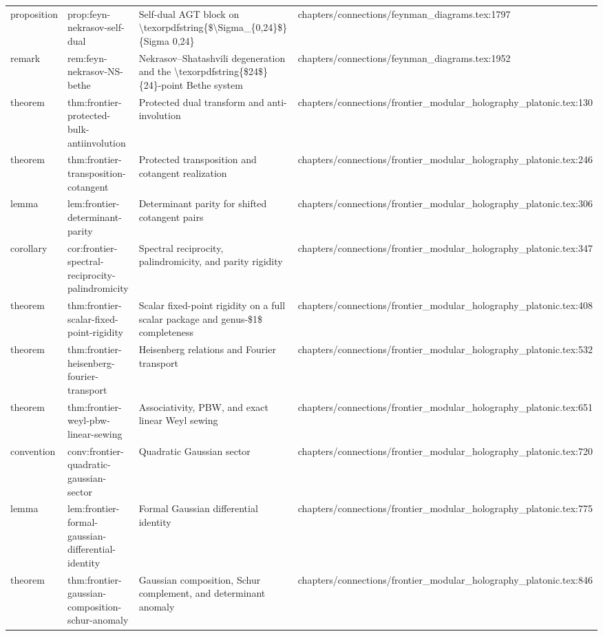 \documentclass[11pt]{article}
\begin{document}
\begin{longtable}{L{0.10\textwidth}L{0.26\textwidth}L{0.42\textwidth}L{0.22\textwidth}}
proposition & prop:feyn-nekrasov-self-dual & Self-dual AGT block on \textbackslash{}texorpdfstring\{\$\textbackslash{}Sigma\_\{0,24\}\$\}\{Sigma 0,24\} & chapters/connections/feynman\_diagrams.tex:1797\\
remark & rem:feyn-nekrasov-NS-bethe & Nekrasov--Shatashvili degeneration and the \textbackslash{}texorpdfstring\{\$24\$\}\{24\}-point Bethe system & chapters/connections/feynman\_diagrams.tex:1952\\
theorem & thm:frontier-protected-bulk-antiinvolution & Protected dual transform and anti-involution & chapters/connections/frontier\_modular\_holography\_platonic.tex:130\\
theorem & thm:frontier-transposition-cotangent & Protected transposition and cotangent realization & chapters/connections/frontier\_modular\_holography\_platonic.tex:246\\
lemma & lem:frontier-determinant-parity & Determinant parity for shifted cotangent pairs & chapters/connections/frontier\_modular\_holography\_platonic.tex:306\\
corollary & cor:frontier-spectral-reciprocity-palindromicity & Spectral reciprocity, palindromicity, and parity rigidity & chapters/connections/frontier\_modular\_holography\_platonic.tex:347\\
theorem & thm:frontier-scalar-fixed-point-rigidity & Scalar fixed-point rigidity on a full scalar package and genus-\$1\$ completeness & chapters/connections/frontier\_modular\_holography\_platonic.tex:408\\
theorem & thm:frontier-heisenberg-fourier-transport & Heisenberg relations and Fourier transport & chapters/connections/frontier\_modular\_holography\_platonic.tex:532\\
theorem & thm:frontier-weyl-pbw-linear-sewing & Associativity, PBW, and exact linear Weyl sewing & chapters/connections/frontier\_modular\_holography\_platonic.tex:651\\
convention & conv:frontier-quadratic-gaussian-sector & Quadratic Gaussian sector & chapters/connections/frontier\_modular\_holography\_platonic.tex:720\\
lemma & lem:frontier-formal-gaussian-differential-identity & Formal Gaussian differential identity & chapters/connections/frontier\_modular\_holography\_platonic.tex:775\\
theorem & thm:frontier-gaussian-composition-schur-anomaly & Gaussian composition, Schur complement, and determinant anomaly & chapters/connections/frontier\_modular\_holography\_platonic.tex:846\\

\end{longtable}
\end{document}
